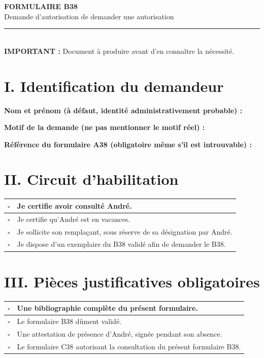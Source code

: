 \documentclass[10pt,a4paper]{article}
\newcommand{\champ}[2]{\textbf{#1}\par\vspace{2mm}\fbox{\parbox[c][#2][c]{\dimexpr\linewidth-2\fboxsep-2\fboxrule\relax}{\strut}}\par\vspace{2mm}}
\begin{document}
\begin{center}
{\Large\bfseries\color{bureau} FORMULAIRE B38}\\[2mm]
{\large Demande d'autorisation de demander une autorisation}\\[2mm]
\rule{\linewidth}{1pt}\\
\textbf{IMPORTANT :} Document à produire avant d'en connaître la nécessité.
\end{center}
\vspace{2mm}
\section*{I. Identification du demandeur}
\champ{Nom et prénom (à défaut, identité administrativement probable) :}{7mm}
\champ{Motif de la demande (ne pas mentionner le motif réel) :}{9mm}
\champ{Référence du formulaire A38 (obligatoire même s'il est introuvable) :}{7mm}
\section*{II. Circuit d'habilitation}
\begin{tabularx}{\linewidth}{|p{.06\linewidth}|X|}
\hline
$\square$&Je certifie avoir consulté André.\\\hline
$\square$&Je certifie qu'André est en vacances.\\\hline
$\square$&Je sollicite son remplaçant, sous réserve de sa désignation par André.\\\hline
$\square$&Je dispose d'un exemplaire du B38 validé afin de demander le B38.\\\hline
\end{tabularx}
\vspace{2mm}
\section*{III. Pièces justificatives obligatoires}
\begin{tabularx}{\linewidth}{|p{.06\linewidth}|X|}
\hline
$\square$&Une bibliographie complète du présent formulaire.\\\hline
$\square$&Le formulaire B38 dûment validé.\\\hline
$\square$&Une attestation de présence d'André, signée pendant son absence.\\\hline
$\square$&Le formulaire C38 autorisant la consultation du présent formulaire B38.\\\hline
\end{tabularx}
\vspace{2mm}
\end{document}
